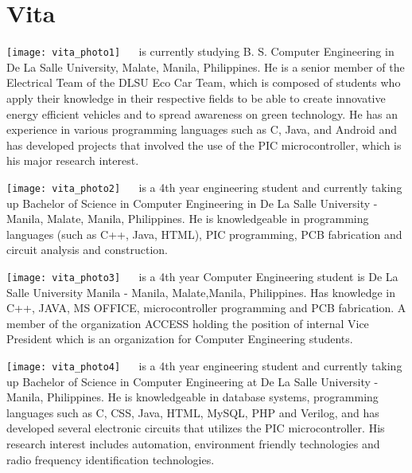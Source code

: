 \chapter{Vita}


{
\vfill

\texttt{[image: vita\_photo1]}
 \  \  is currently studying B. S. Computer Engineering in De La Salle University, Malate, Manila, Philippines. He is a senior member of the Electrical Team of the DLSU Eco Car Team, which is composed of students who apply their knowledge in their respective fields to be able to create innovative energy efficient vehicles and to spread awareness on green technology. He has an experience in various programming languages such as C, Java, and Android and has developed projects that involved the use of the PIC microcontroller, which is his major research interest.

\texttt{[image: vita\_photo2]}
 \  \ is a 4th year engineering student and currently 
taking up Bachelor of Science in Computer Engineering in De La Salle University - Manila, Malate, Manila, Philippines. He is knowledgeable in programming languages (such as C++, Java, HTML), PIC programming, PCB fabrication and circuit analysis and construction.

\texttt{[image: vita\_photo3]}
 \  \ is a 4th year Computer Engineering student is De La Salle University Manila - Manila, Malate,Manila, Philippines. Has knowledge in C++, JAVA, MS OFFICE, microcontroller programming and PCB fabrication. A member of the organization ACCESS holding the position of internal Vice President which is an organization for Computer Engineering students.

\texttt{[image: vita\_photo4]}
 \  \ is a 4th year engineering student and currently  taking up Bachelor of Science in Computer Engineering at De La Salle University - Manila, Philippines. He is knowledgeable in database systems, programming languages such as C, CSS, Java, HTML, MySQL,  PHP and Verilog, and has developed several electronic circuits that utilizes the PIC microcontroller. His research interest includes automation, environment friendly technologies and radio frequency identification  technologies.


\vfill
}